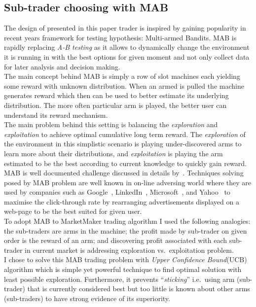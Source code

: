 \documentclass{llncs}
\begin{document}
\subsection{Sub-trader choosing with MAB}
The design of presented in this paper trader is inspired by gaining popularity in recent years framework for testing hypothesis: Multi-armed Bandits. MAB is rapidly replacing \emph{A-B testing} as it allows to dynamically change the environment it is running in with the best options for given moment and not only collect data for later analysis and decision making.\\
The main concept behind MAB is simply a row of slot machines each yielding some reward with unknown distribution. When an armed is pulled the machine generates reward which then can be used to better estimate its underlying distribution. The more often particular arm is played, the better user can understand its reward mechanism.\\
The main problem behind this setting is balancing the \emph{exploration} and \emph{exploitation} to achieve optimal cumulative long term reward. The \emph{exploration} of the environment in this simplistic scenario is playing under-discovered arms to learn more about their distributions, and \emph{exploitation} is playing the arm estimated to be the best according to current knowledge to quickly gain reward.\\
MAB is well documented challenge discussed in details by~\cite{berry+firstedt,gittins+glazebrook+weber}. Techniques solving posed by MAB problem are well known in on-line adversing world where they are used by companies such as Google~\cite{AYPSze12,ASMB:ASMB874}, LinkedIn~\cite{Tang:2013:AAF:2505515.2514700}, Microsoft~\cite{graepel2010web}, and Yahoo~\cite{Li:2010:CAP:1772690.1772758} to maximise the click-through rate by rearranging advertisements displayed on a web-page to be the best suited for given user.\\

To adopt MAB to MarketMaker trading algorithm I used the following analogies: the sub-traders are arms in the machine; the profit made by sub-trader on given order is the reward of an arm; and discovering profit associated with each sub-trader in current market is addressing exploration vs.\ exploitation problem.\\
I chose to solve this MAB trading problem with \emph{Upper Confidence Bound}(UCB)~\cite{white2012bandit} algorithm which is simple yet powerful technique to find optimal solution with least possible exploration. Furthermore, it prevents ``\emph{sticking}'' i.e.\ using arm (sub-trader) that is currently considered best but too little is known about other arms (sub-traders) to have strong evidence of its superiority.\\
\end{document}

